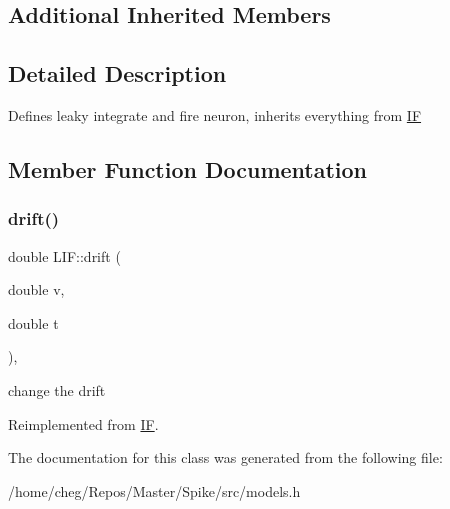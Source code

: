 \subsection*{Additional Inherited Members}


\subsection{Detailed Description}
Defines leaky integrate and fire neuron, inherits everything from \hyperlink{classIF}{IF} 

\subsection{Member Function Documentation}
\mbox{\label{classLIF_aea677a0cf3f943edb7a957479e18d6dc}} 
\subsubsection{\texorpdfstring{drift()}{drift()}}
{\footnotesize\ttfamily double L\+I\+F\+::drift (\begin{DoxyParamCaption}\item[{double}]{v,  }\item[{double}]{t }\end{DoxyParamCaption})\hspace{0.3cm}{\ttfamily [inline]}, {\ttfamily [virtual]}}

change the drift 

Reimplemented from \hyperlink{classIF_a9bbd53df68cb9028bf87cf5273253e91}{IF}.



The documentation for this class was generated from the following file\+:\begin{DoxyCompactItemize}
\item 
/home/cheg/\+Repos/\+Master/\+Spike/src/models.\+h\end{DoxyCompactItemize}

